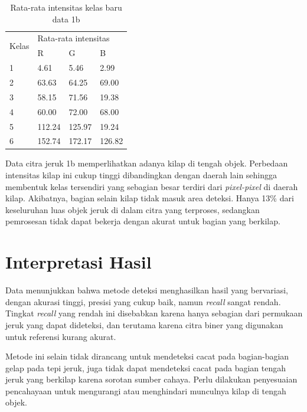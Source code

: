 \documentclass[laporan.tex]{subfiles}
\begin{document}
\begin{table}[h!]
\centering
\begin{tabular}{|l|l|l|l|}
\cline{1-4}
\multirow{2}{*}{Kelas} & \multicolumn{3}{l|}{Rata-rata intensitas} \\
\cline{2-4}
 & R & G & B \\
\cline{1-4}
1 & 4.61 & 5.46 & 2.99 \\
2 & 63.63 & 64.25 & 69.00 \\
3 & 58.15 & 71.56 & 19.38 \\
4 & 60.00 & 72.00 & 68.00 \\
5 & 112.24 & 125.97 & 19.24 \\
6 & 152.74 & 172.17 & 126.82 \\
\cline{1-4}
\end{tabular}
\caption[]{Rata-rata intensitas kelas baru data 1b}
\end{table}

Data citra jeruk 1b memperlihatkan adanya kilap di tengah objek. Perbedaan intensitas kilap ini cukup tinggi dibandingkan dengan daerah lain sehingga membentuk kelas tersendiri yang sebagian besar terdiri dari \emph{pixel-pixel} di daerah kilap. Akibatnya, bagian selain kilap tidak masuk area deteksi. Hanya 13\% dari keseluruhan luas objek jeruk di dalam citra yang terproses, sedangkan pemrosesan tidak dapat bekerja dengan akurat untuk bagian yang berkilap.

\FloatBarrier

\section{Interpretasi Hasil}

Data menunjukkan bahwa metode deteksi menghasilkan hasil yang bervariasi, dengan akurasi tinggi, presisi yang cukup baik, namun \emph{recall} sangat rendah. Tingkat \emph{recall} yang rendah ini disebabkan karena hanya sebagian dari permukaan jeruk yang dapat dideteksi, dan terutama karena citra biner yang digunakan untuk referensi kurang akurat.

Metode ini selain tidak dirancang untuk mendeteksi cacat pada bagian-bagian gelap pada tepi jeruk, juga tidak dapat mendeteksi cacat pada bagian tengah jeruk yang berkilap karena sorotan sumber cahaya. Perlu dilakukan penyesuaian pencahayaan untuk mengurangi atau menghindari munculnya kilap di tengah objek.
\end{document}
